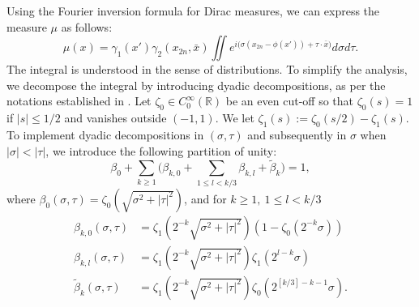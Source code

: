 \documentclass[11pt]{amsart}
\newcommand {\R}{\mathbb R}
\theoremstyle{definition}
\numberwithin{equation}{section}
\begin{document}
Using the Fourier inversion formula for Dirac measures, we can express the measure $\mu$ as follows:
\begin{equation}
    \label{diracFT}
    \mu(x)= \gamma_1(x') \gamma_2(x_{2n}, \bar{x})
 \iint 
e^{i\big(\sigma(x_{2n}-\phi(x'))+\tau \cdot \bar{x}\big)} 
 d\sigma d\tau.
\end{equation}
The integral is understood in the sense of distributions.
To simplify the analysis, we decompose the integral by introducing dyadic decompositions, as per the notations established in \cite{MS}. 
Let $\zeta_0\in C^\infty_0(\R)$ be an even cut-off  so that
$\zeta_0(s)=1$ if $|s|\le 1/2$ and vanishes outside $(-1,1)$.
We let  $\zeta_1(s):=\zeta_0(s/2)-\zeta_1(s).$ To implement dyadic decompositions in $(\sigma, \tau)$ and subsequently in $\sigma$ when $|\sigma| < |\tau|$, we introduce the following partition of unity:
$$\beta_0+\sum_{k\ge 1}\big(\beta_{k,0}+\sum_{1\le l<k/3}\beta_{k,l}
+\widetilde \beta_{k}\big)=1,$$
where $\beta_{0}(\sigma,\tau)=\zeta_0(\sqrt{\sigma^2+|\tau|^2})$, and for $k\geq 1,~1\leq l<k/3$
\begin{align*}
\beta_{k,0}(\sigma,\tau)&=\zeta_1(2^{-k}\sqrt{\sigma^2+|\tau|^2})(1-\zeta_0(2^{-k}\sigma))
\\
\beta_{k,l}(\sigma,\tau)&=\zeta_1(2^{-k}\sqrt{\sigma^2+|\tau|^2})\zeta_1(2^{l-k}\sigma)
\\
\widetilde \beta_{k}(\sigma,\tau)&=\zeta_1(2^{-k}\sqrt{\sigma^2+|\tau|^2})
\zeta_0(2^{[k/3]-k-1}\sigma).
\end{align*}
\end{document}
